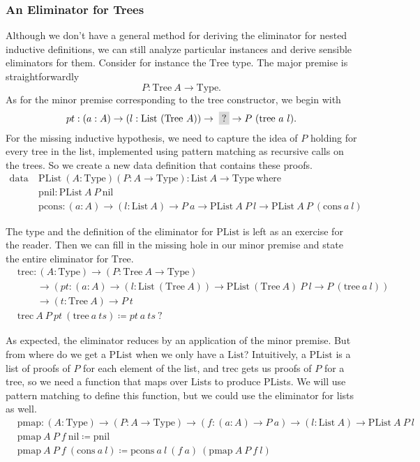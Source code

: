 \documentclass{report}
\newcommand{\List}{\const{List}}
\newcommand{\nil}{\const{nil}}
\newcommand{\cons}{\const{cons}}
\newcommand{\PList}{\const{PList}}
\newcommand{\pnil}{\const{pnil}}
\newcommand{\pcons}{\const{pcons}}
\newcommand{\Tree}{\const{Tree}}
\newcommand{\tree}{\const{tree}}
\newcommand{\const}[1]{\text{#1}}
\newcommand{\hole}{\colorbox{gray!30}{?}}
\newcommand{\data}{\const{data}}
\newcommand{\Type}{\const{Type}}
\newcommand{\where}{\const{where}}
\begin{document}
\subsubsection{An Eliminator for Trees}

Although we don't have a general method for deriving the eliminator for nested inductive definitions, we can still analyze particular instances and derive sensible eliminators for them. Consider for instance the $\Tree$ type. The major premise is straightforwardly $$P: \Tree ~ A \to \Type.$$ As for the minor premise corresponding to the $\tree$ constructor, we begin with $$pt: (a: A) \to (l: \List ~ (\Tree ~ A)) \to \; \hole \to P ~ (\tree ~ a ~ l).$$ For the missing inductive hypothesis, we need to capture the idea of $P$ holding for every tree in the list, implemented using pattern matching as recursive calls on the trees. So we create a new data definition that contains these proofs.
%
\begin{align*}
    \data ~ &\PList ~ (A: \Type) (P: A \to \Type): \List ~ A \to \Type ~ \where \\
    &\pnil: \PList ~ A ~ P ~ \nil \\
    &\pcons: (a: A) \to (l: \List ~ A) \to P ~ a \to \PList ~ A ~ P ~ l \to \PList ~ A ~ P ~ (\cons ~ a ~ l)
\end{align*}

The type and the definition of the eliminator for $\PList$ is left as an exercise for the reader. Then we can fill in the missing hole in our minor premise and state the entire eliminator for $\Tree$.
%
\begin{align*}
    &\const{trec}: (A: \Type) \to (P: \Tree ~ A \to \Type) \\
    &\qquad\to (pt: (a: A) \to (l: \List ~ (\Tree ~ A)) \to \PList ~ (\Tree ~ A) ~ P ~ l \to P ~ (\tree ~ a ~ l)) \\
    &\qquad\to (t: \Tree ~ A) \to P ~ t \\
    &\const{trec} ~ A ~ P ~ pt ~ (\tree ~ a ~ ts) \coloneqq pt ~ a ~ ts ~ ?
\end{align*}

As expected, the eliminator reduces by an application of the minor premise. But from where do we get a $\PList$ when we only have a $\List$? Intuitively, a $\PList$ is a list of proofs of $P$ for each element of the list, and $\const{trec}$ gets us proofs of $P$ for a tree, so we need a function that maps over $\List$s to produce $\PList$s. We will use pattern matching to define this function, but we could use the eliminator for lists as well.
%
\begin{align*}
    &\const{pmap}: (A: \Type) \to (P: A \to \Type) \to (f: (a: A) \to P ~ a) \to (l: \List ~ A) \to \PList ~ A ~ P ~ l \\
    &\const{pmap} ~ A ~ P ~ f ~ \nil \coloneqq \pnil \\
    &\const{pmap} ~ A ~ P ~ f ~ (\cons ~ a ~ l) \coloneqq \pcons ~ a ~ l ~ (f ~ a) ~ (\const{pmap} ~ A ~ P ~ f ~ l)
\end{align*}
\end{document}
